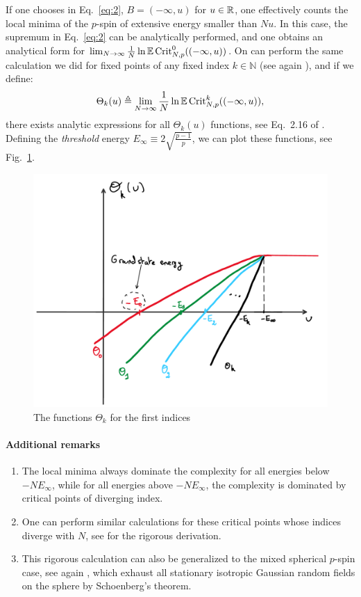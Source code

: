 \documentclass[amsmath,amssymb,nofootinbib,prd]{article}
\begin{document}
	If one chooses in Eq.~\ref{eq:2}, $B = (-\infty,u)$ for $u \in \mathbb{R}$, one effectively counts the local minima of the $p$-spin of extensive energy smaller than $Nu$. In this case, the supremum in Eq.~\ref{eq:2} can be analytically performed, and one obtains an analytical form for $\lim_{N \to \infty} \frac{1}{N} \ln \mathbb{E} \, \mathrm{Crit}_{N,p}^0((-\infty,u))$. On can perform the same calculation we did for fixed points of any fixed index $k \in \mathbb{N}$ (see again \cite{auffinger2013random}), and if we define:
	\begin{align}
	\Theta_k(u) \triangleq \lim_{N \to \infty} \frac{1}{N} \ln \mathbb{E} \, \mathrm{Crit}_{N,p}^k((-\infty,u)),
	\end{align}
	there exists analytic expressions for all $\Theta_k(u)$ functions, see Eq.~2.16 of \cite{auffinger2013random}. Defining the \emph{threshold} energy $E_\infty \equiv 2 \sqrt{\frac{p-1}{p}}$, we can plot these functions, see Fig.~\ref{fig:fig}.
		\begin{figure}
		\centering
	\includegraphics[scale=0.4]{figure.pdf}
	\caption{The functions $\Theta_k$ for the first indices}\label{fig:fig}
	\end{figure}

	
	\paragraph{Additional remarks}
	\begin{enumerate}
\item The local minima always dominate the complexity for all energies below $-N E_\infty$, while for all energies above $-N E_\infty$, the complexity is dominated by critical points of diverging index.
\item One can perform similar calculations for these critical points whose indices diverge with $N$, see \cite{auffinger2013complexity}  for the rigorous derivation.
\item This rigorous calculation can also be generalized to the mixed spherical $p$-spin case, see again \cite{auffinger2013complexity}, which exhaust all stationary isotropic Gaussian random fields on the sphere by Schoenberg's theorem.
	\end{enumerate}
	
 

\end{document}
